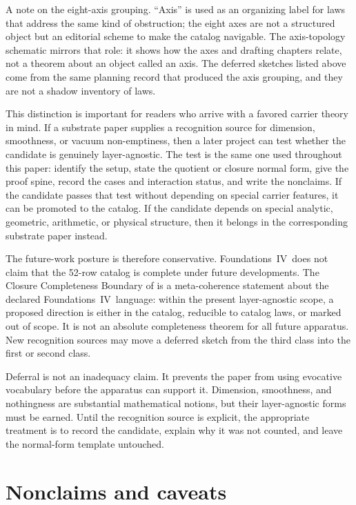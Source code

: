 \documentclass[11pt]{article}
\newcommand{\FIV}{Foundations~IV}
\newcommand{\NumLaws}{52}
\theoremstyle{definition}
\begin{document}
A note on the eight-axis grouping. ``Axis'' is used as an
organizing label for laws that address the same kind of
obstruction; the eight axes are not a structured object but an
editorial scheme to make the catalog navigable. The axis-topology
schematic mirrors that role: it shows how the axes and drafting
chapters relate, not a theorem about an object called an axis. The
deferred sketches listed above come from the same planning record
that produced the axis grouping, and they are not a shadow
inventory of laws.

This distinction is important for readers who arrive with a favored
carrier theory in mind. If a substrate paper supplies a recognition
source for dimension, smoothness, or vacuum non-emptiness, then a later
project can test whether the candidate is genuinely layer-agnostic. The
test is the same one used throughout this paper: identify the setup,
state the quotient or closure normal form, give the proof spine, record
the cases and interaction status, and write the nonclaims. If the
candidate passes that test without depending on special carrier
features, it can be promoted to the catalog. If the candidate depends on
special analytic, geometric, arithmetic, or physical structure, then it
belongs in the corresponding substrate paper instead.

The future-work posture is therefore conservative. \FIV\ does not claim
that the \NumLaws-row catalog is complete under future developments. The
Closure Completeness Boundary of
 is a
meta-coherence statement about the declared \FIV\ language: within the
present layer-agnostic scope, a proposed direction is either in the
catalog, reducible to catalog laws, or marked out of scope. It is not an
absolute completeness theorem for all future apparatus. New recognition
sources may move a deferred sketch from the third class into the first
or second class.

Deferral is not an inadequacy claim. It prevents the paper from
using evocative vocabulary before the apparatus can support it.
Dimension, smoothness, and nothingness are substantial mathematical
notions, but their layer-agnostic forms must be earned. Until the
recognition source is explicit, the appropriate treatment is to
record the candidate, explain why it was not counted, and leave the
normal-form template untouched.
 \section{Nonclaims and caveats}\label{sec:nonclaims}
\end{document}
